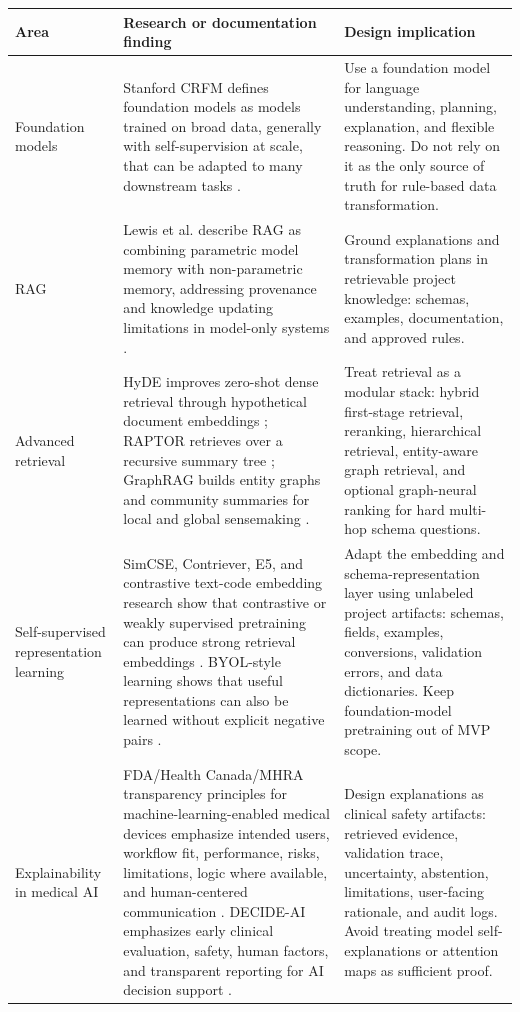 \begin{longtable}{p{}p{}p{}}
\toprule
\textbf{Area} & \textbf{Research or documentation finding} & \textbf{Design implication} \\
\midrule
Foundation models & Stanford CRFM defines foundation models as models trained on broad data, generally with self-supervision at scale, that can be adapted to many downstream tasks \cite{bommasani2021foundation}. & Use a foundation model for language understanding, planning, explanation, and flexible reasoning. Do not rely on it as the only source of truth for rule-based data transformation. \\
\addlinespace
RAG & Lewis et al. describe RAG as combining parametric model memory with non-parametric memory, addressing provenance and knowledge updating limitations in model-only systems \cite{lewis2020rag}. & Ground explanations and transformation plans in retrievable project knowledge: schemas, examples, documentation, and approved rules. \\
\addlinespace
Advanced retrieval & HyDE improves zero-shot dense retrieval through hypothetical document embeddings \cite{gao2022hyde}; RAPTOR retrieves over a recursive summary tree \cite{sarthi2024raptor}; GraphRAG builds entity graphs and community summaries for local and global sensemaking \cite{edge2024graphrag}. & Treat retrieval as a modular stack: hybrid first-stage retrieval, reranking, hierarchical retrieval, entity-aware graph retrieval, and optional graph-neural ranking for hard multi-hop schema questions. \\
\addlinespace
Self-supervised representation learning & SimCSE, Contriever, E5, and contrastive text-code embedding research show that contrastive or weakly supervised pretraining can produce strong retrieval embeddings \cite{gao2021simcse,izacard2021contriever,wang2022e5,neelakantan2022textcode}. BYOL-style learning shows that useful representations can also be learned without explicit negative pairs \cite{grill2020byol}. & Adapt the embedding and schema-representation layer using unlabeled project artifacts: schemas, fields, examples, conversions, validation errors, and data dictionaries. Keep foundation-model pretraining out of MVP scope. \\
\addlinespace
Explainability in medical AI & FDA/Health Canada/MHRA transparency principles for machine-learning-enabled medical devices emphasize intended users, workflow fit, performance, risks, limitations, logic where available, and human-centered communication \cite{fdaTransparency}. DECIDE-AI emphasizes early clinical evaluation, safety, human factors, and transparent reporting for AI decision support \cite{vasey2022decide}. & Design explanations as clinical safety artifacts: retrieved evidence, validation trace, uncertainty, abstention, limitations, user-facing rationale, and audit logs. Avoid treating model self-explanations or attention maps as sufficient proof. \\

\end{longtable}
